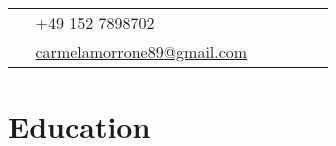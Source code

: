 \documentclass[10pt]{article} %
\begin{document}
\begin{paracol}{2}
\switchcolumn %


\parbox[top][0.12\textheight][c]{\linewidth}{ %
	\vspace{-0.04\textheight} %
	\colorbox{shade}{ %
		\begin{supertabular}{p{0.05\linewidth}|p{0.775\linewidth}} %
			\raisebox{-1pt}{\faPhone} & +49 152 7898702 \\ %
			\raisebox{0pt}{\small\faEnvelope} & \href{mailto:carmelamorrone89@gmail.com}{carmelamorrone89@gmail.com} \\ %
		\end{supertabular}
	}
}


\section{Education} 




\end{paracol}
\end{document}
